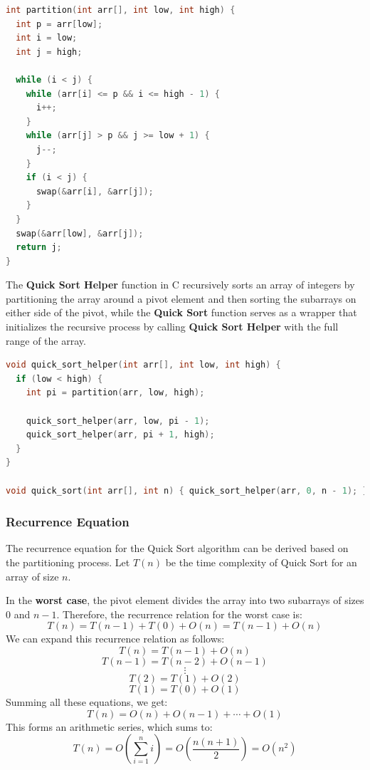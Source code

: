 \documentclass{article}
\begin{document}
\newpage
\begin{lstlisting}[language=C, caption=Partition implementation]
int partition(int arr[], int low, int high) {
  int p = arr[low];
  int i = low;
  int j = high;

  while (i < j) {
    while (arr[i] <= p && i <= high - 1) {
      i++;
    }
    while (arr[j] > p && j >= low + 1) {
      j--;
    }
    if (i < j) {
      swap(&arr[i], &arr[j]);
    }
  }
  swap(&arr[low], &arr[j]);
  return j;
}
\end{lstlisting}

The \textbf{Quick Sort Helper} function in C recursively sorts an array of integers by partitioning the array around a pivot element and then sorting the subarrays on either side of the pivot, while the \textbf{Quick Sort} function serves as a wrapper that initializes the recursive process by calling \textbf{Quick Sort Helper} with the full range of the array.

\begin{lstlisting}[language=C, caption=Quick Sort implementation]
void quick_sort_helper(int arr[], int low, int high) {
  if (low < high) {
    int pi = partition(arr, low, high);

    quick_sort_helper(arr, low, pi - 1);
    quick_sort_helper(arr, pi + 1, high);
  }
}

void quick_sort(int arr[], int n) { quick_sort_helper(arr, 0, n - 1); }
\end{lstlisting}

\newpage
\subsubsection{Recurrence Equation}
The recurrence equation for the Quick Sort algorithm can be derived based on the partitioning process. Let $T(n)$ be the time complexity of Quick Sort for an array of size $n$.

In the \textbf{worst case}, the pivot element divides the array into two subarrays of sizes $0$ and $n-1$. Therefore, the recurrence relation for the worst case is:
\[
	T(n) = T(n-1) + T(0) + O(n) = T(n-1) + O(n)
\]
We can expand this recurrence relation as follows:
\[
	T(n) = T(n-1) + O(n)
\]
\[
	T(n-1) = T(n-2) + O(n-1)
\]
\[
	\vdots
\]
\[
	T(2) = T(1) + O(2)
\]
\[
	T(1) = T(0) + O(1)
\]
Summing all these equations, we get:
\[
	T(n) = O(n) + O(n-1) + \cdots + O(1)
\]
This forms an arithmetic series, which sums to:
\[
	T(n) = O\left(\sum_{i=1}^{n} i\right) = O\left(\frac{n(n+1)}{2}\right) = O(n^2)
\]
\end{document}
